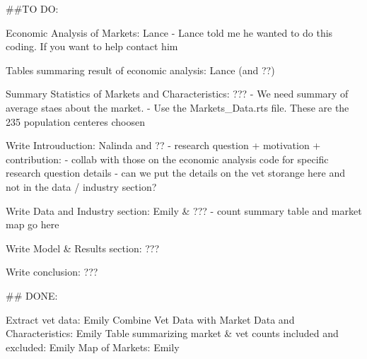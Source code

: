 ##TO DO:

Economic Analysis of Markets: Lance
    - Lance told me he wanted to do this coding. If you want to help contact him

Tables summaring result of economic analysis: Lance (and ??)

Summary Statistics of Markets and Characteristics: ???
    - We need summary of average staes about the market. 
    - Use the Markets_Data.rts file. These are the 235 population centeres choosen

Write Introuduction: Nalinda and ??
    - research question + motivation + contribution: 
    - collab with those on the economic analysis code for specific research question details 
    - can we put the details on the vet storange here and not in the data / industry section? 

Write Data and Industry section: Emily & ???
    - count summary table and market map go here 

Write Model & Results section: ???

Write conclusion:  ???

## DONE: 

Extract vet data: Emily 
Combine Vet Data with Market Data and Characteristics: Emily 
Table summarizing market & vet counts included and excluded: Emily
Map of Markets: Emily 
